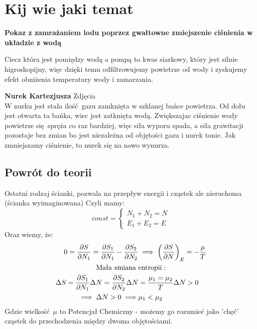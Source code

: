 \documentclass[12pt,a4paper]{report}
\newcommand{\ind}[1]{{\color{blue} #1\index{#1}}}
\newcommand{\com}[1]{{\color{red} #1}}
\renewcommand{\emph}{\textbf}
\newenvironment{lecture}[1]{\par\medskip
   \noindent\chapter{#1} \rmfamily}{\medskip}
\begin{document}
\begin{lecture}{Kij wie jaki temat}
\emph{Pokaz z zamrażaniem lodu poprzez gwałtowne zmiejszenie ciśnienia w układzie z wodą}

Ciecz która jest pomiędzy wodą a pompą to kwas siarkowy, który jest silnie higroskopijny, więc dzięki temu odfiltrowujemy powietrze od wody i zyskujemy efekt obniżenia temperatury wody i zamarzania. 

\emph{Nurek Kartezjusza} \com{Zdjęcia}\\
W nurku jest stała ilość gazu zamknięta w szklanej bańce powietrza. Od dołu jest otwarta ta bańka, wiec jest zatknięta wodą. Zwiększajac ciśnienie wody powietrze się spręża co raz bardziej, więc siła wyporu spada, a siła grawitacji pozostaje bez zmian bo jest niezależna od objętości gazu i nurek tonie. Jak zmniejszamy ciśnienie, to nurek się na nowo wynurza.

\section{Powrót do teorii}
Ostatni rodzaj ścianki, pozwala na przepływ energii i cząstek ale nieruchoma (ścianka wyimaginowana)
Czyli mamy:
\[
    const = 
    \begin{cases}
    N_1 + N_2 = N\\
    E_1 + E_2 = E
    \end{cases}
\]
Oraz wiemy, że:
\begin{align*}
    0 = \pdv{S}{N_1} = \pdv{S_1}{N_1} - \pdv{S_2}{N_2} &\implies \qty(\pdv{S}{N})_E = - \frac{\mu}{T}\\
    \text{Mała zmiana }&\text{entropii}:\\
    \Delta S = \pdv{S_1}{N_1}\Delta N = \pdv{S_2}{N_2}\Delta N &= \frac{\mu_1 = \mu_2}{T} \Delta N > 0\\
    \implies \Delta N>0\implies&\mu_1 < \mu_2
\end{align*}
Gdzie wielkość $\mu$ to \ind{Potencjał Chemiczny} - możemy go rozumieć jako 'chęć' cząstek do przechodzenia między dwoma objętościami.

\end{lecture}

\end{document}
